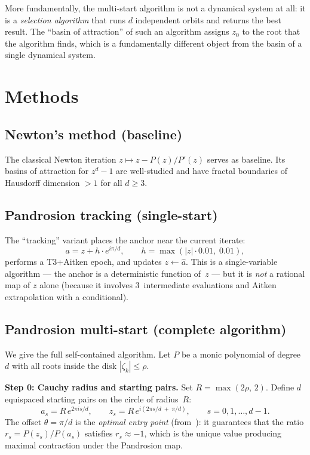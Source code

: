 \documentclass[11pt,a4paper]{article}
\theoremstyle{definition}
\theoremstyle{remark}
\begin{document}
More fundamentally, the multi-start algorithm is not a dynamical system at all: it is a \emph{selection algorithm} that runs $d$ independent orbits and returns the best result.  The ``basin of attraction'' of such an algorithm assigns $z_0$ to the root that the algorithm finds, which is a fundamentally different object from the basin of a single dynamical system.

\section{Methods}
\label{sec:methods}

\subsection{Newton's method (baseline)}

The classical Newton iteration $z \mapsto z - P(z)/P'(z)$ serves as baseline.  Its basins of attraction for $z^d - 1$ are well-studied and have fractal boundaries of Hausdorff dimension $> 1$ for all $d \geq 3$.

\subsection{Pandrosion tracking (single-start)}

The ``tracking'' variant places the anchor near the current iterate:
\[
a = z + h \cdot e^{i\pi/d}, \qquad h = \max(|z| \cdot 0.01,\; 0.01),
\]
performs a T3+Aitken epoch, and updates $z \leftarrow \hat{a}$.  This is a single-variable algorithm --- the anchor is a deterministic function of~$z$ --- but it is \emph{not} a rational map of $z$ alone (because it involves 3~intermediate evaluations and Aitken extrapolation with a conditional).

\subsection{Pandrosion multi-start (complete algorithm)}
\label{sec:multistart}

We give the full self-contained algorithm.  Let $P$ be a monic polynomial of degree~$d$ with all roots inside the disk $|\zeta_k| \leq \rho$.

\medskip
\noindent\textbf{Step 0: Cauchy radius and starting pairs.}  Set $R = \max(2\rho,\, 2)$.  Define $d$ equispaced starting pairs on the circle of radius~$R$:
\[
  a_s = R\,e^{2\pi i s/d}, \qquad
  z_s = R\,e^{i(2\pi s/d \;+\; \pi/d)},
  \qquad s = 0, 1, \ldots, d-1.
\]
The offset $\theta = \pi/d$ is the \emph{optimal entry point} (from~\cite{Besevic2026a}): it guarantees that the ratio $r_s = P(z_s)/P(a_s)$ satisfies $r_s \approx -1$, which is the unique value producing maximal contraction under the Pandrosion map.
\end{document}
